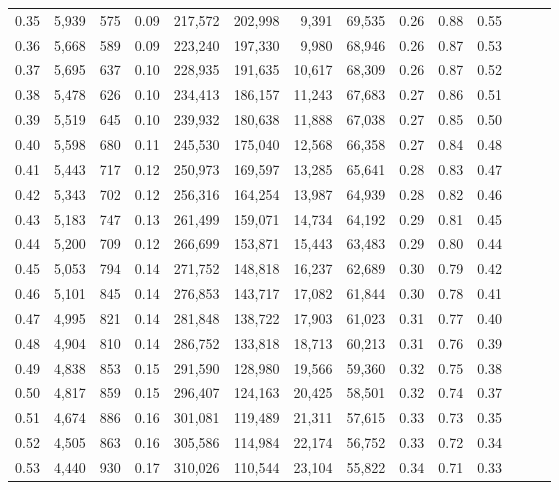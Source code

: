 \begin{tabular}{rrrrrrrrrrrrrr}
0.35 &  5,939 &    575 &  0.09 &  217,572 &  202,998 &   9,391 &  69,535 &  0.26 &  0.88 &      0.55 \\
0.36 &  5,668 &    589 &  0.09 &  223,240 &  197,330 &   9,980 &  68,946 &  0.26 &  0.87 &      0.53 \\
0.37 &  5,695 &    637 &  0.10 &  228,935 &  191,635 &  10,617 &  68,309 &  0.26 &  0.87 &      0.52 \\
0.38 &  5,478 &    626 &  0.10 &  234,413 &  186,157 &  11,243 &  67,683 &  0.27 &  0.86 &      0.51 \\
0.39 &  5,519 &    645 &  0.10 &  239,932 &  180,638 &  11,888 &  67,038 &  0.27 &  0.85 &      0.50 \\
0.40 &  5,598 &    680 &  0.11 &  245,530 &  175,040 &  12,568 &  66,358 &  0.27 &  0.84 &      0.48 \\
0.41 &  5,443 &    717 &  0.12 &  250,973 &  169,597 &  13,285 &  65,641 &  0.28 &  0.83 &      0.47 \\
0.42 &  5,343 &    702 &  0.12 &  256,316 &  164,254 &  13,987 &  64,939 &  0.28 &  0.82 &      0.46 \\
0.43 &  5,183 &    747 &  0.13 &  261,499 &  159,071 &  14,734 &  64,192 &  0.29 &  0.81 &      0.45 \\
0.44 &  5,200 &    709 &  0.12 &  266,699 &  153,871 &  15,443 &  63,483 &  0.29 &  0.80 &      0.44 \\
0.45 &  5,053 &    794 &  0.14 &  271,752 &  148,818 &  16,237 &  62,689 &  0.30 &  0.79 &      0.42 \\
0.46 &  5,101 &    845 &  0.14 &  276,853 &  143,717 &  17,082 &  61,844 &  0.30 &  0.78 &      0.41 \\
0.47 &  4,995 &    821 &  0.14 &  281,848 &  138,722 &  17,903 &  61,023 &  0.31 &  0.77 &      0.40 \\
0.48 &  4,904 &    810 &  0.14 &  286,752 &  133,818 &  18,713 &  60,213 &  0.31 &  0.76 &      0.39 \\
0.49 &  4,838 &    853 &  0.15 &  291,590 &  128,980 &  19,566 &  59,360 &  0.32 &  0.75 &      0.38 \\
0.50 &  4,817 &    859 &  0.15 &  296,407 &  124,163 &  20,425 &  58,501 &  0.32 &  0.74 &      0.37 \\
0.51 &  4,674 &    886 &  0.16 &  301,081 &  119,489 &  21,311 &  57,615 &  0.33 &  0.73 &      0.35 \\
0.52 &  4,505 &    863 &  0.16 &  305,586 &  114,984 &  22,174 &  56,752 &  0.33 &  0.72 &      0.34 \\
0.53 &  4,440 &    930 &  0.17 &  310,026 &  110,544 &  23,104 &  55,822 &  0.34 &  0.71 &      0.33 \\

\end{tabular}
